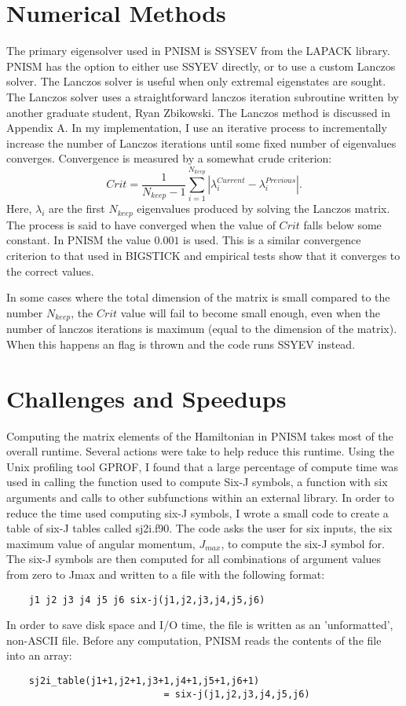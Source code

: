 \section{Numerical Methods}
The primary eigensolver used in PNISM is SSYSEV from the LAPACK library\cite{LAPACK}. PNISM
has the option to either use SSYEV directly, or to use a custom Lanczos solver.
The Lanczos solver is useful when only extremal eigenstates are sought.
The Lanczos solver uses a straightforward lanczos iteration subroutine written by
another graduate student, Ryan Zbikowski. The Lanczos method is discussed in Appendix
A. In my implementation, I use an iterative
process to incrementally increase the number of Lanczos iterations until 
some fixed number of eigenvalues converges. Convergence is measured by a somewhat
crude criterion:
\begin{equation}
    Crit = \frac{1}{N_{keep}-1}\sum_{i=1}^{N_{keep}} |\lambda_i^{Current}-\lambda_i^{Previous}|.
\end{equation}
Here, $\lambda_i$ are the first $N_{keep}$ eigenvalues produced by solving the 
Lanczos matrix. The process is said to have converged when the value of $Crit$ 
falls below some constant. In PNISM the value $0.001$ is used. This is a similar 
convergence criterion to that used in BIGSTICK and empirical tests show that it converges to the
correct values.

In some cases where the total dimension of the matrix is small compared to the 
number $N_{keep}$, the $Crit$ value will fail to become small enough, even when
the number of lanczos iterations is maximum (equal to the dimension of
the matrix). When this happens an flag is thrown and the code runs SSYEV instead.

\section{Challenges and Speedups}


Computing the matrix elements of the Hamiltonian in PNISM takes most of the 
overall runtime. Several actions were take to help reduce this runtime. Using
the Unix profiling tool GPROF, I found that a large percentage of compute time
was used in calling the function used to compute Six-J symbols, a function with 
six arguments and calls to other subfunctions within an external library. In order
 to reduce the time used computing six-J symbols, I wrote a small code to create
a table of six-J tables called sj2i.f90. The code asks the user for six inputs,
the six maximum value of angular momentum, $J_{max}$, to compute the six-J symbol for. 
The six-J symbols are then computed for all combinations of argument values from zero
to Jmax and written to a file with the following format:
\begin{verbatim}
    j1 j2 j3 j4 j5 j6 six-j(j1,j2,j3,j4,j5,j6)
\end{verbatim}
In order to save disk space and I/O time, the file is written as an 'unformatted', 
non-ASCII file. Before any computation, PNISM reads the contents of the file into
an array:
\begin{verbatim}
    sj2i_table(j1+1,j2+1,j3+1,j4+1,j5+1,j6+1) 
                            = six-j(j1,j2,j3,j4,j5,j6)
\end{verbatim}

